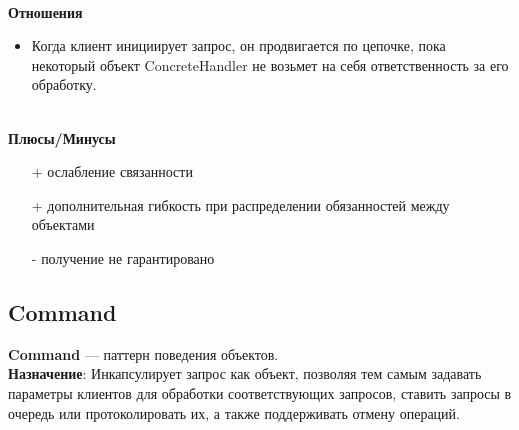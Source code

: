 \documentclass[a3paper,11pt]{report}
\begin{document}
\textbf{\\Отношения}
\begin{itemize}
\item Когда клиент инициирует запрос, он продвигается по цепочке, пока некоторый объект ConcreteHandler не возьмет на себя ответственность за его обработку.
\end{itemize}

\textbf{\\Плюсы/Минусы}
\begin{itemize}
\item [+] ослабление связанности
\item [+] дополнительная гибкость при распределении обязанностей между объектами
\item [-] получение не гарантировано
\end{itemize}

\newpage 
\subsection{Command}

\large\textbf{Command} --- паттерн поведения объектов.
\\
\large\textbf{Назначение}: Инкапсулирует запрос как объект, позволяя тем самым задавать параметры клиентов для обработки соответствующих запросов, ставить запросы в очередь или протоколировать их, а также поддерживать отмену операций.
\\
\end{document}
